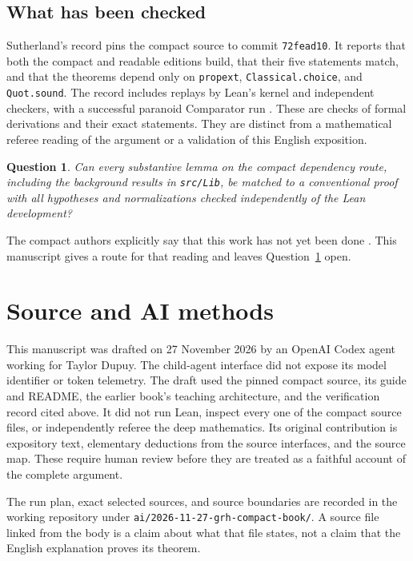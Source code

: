 \documentclass[11pt,oneside,openany]{amsbook}
\newtheorem{question}[theorem]{Question}
\theoremstyle{remark}
\numberwithin{equation}{section}
\begin{document}
\section{What has been checked}
Sutherland's record pins the compact source to commit
\texttt{72fead10}. It reports that both the compact and readable
editions build, that their five statements match, and that the
theorems depend only on \texttt{propext},
\texttt{Classical.choice}, and \texttt{Quot.sound}. The
record includes replays by Lean's kernel and independent
checkers, with a successful paranoid Comparator run
\cite[Summary]{Sutherland2026}. These are checks of formal
derivations and their exact statements. They are distinct from
a mathematical referee reading of the argument or a validation
of this English exposition.

\begin{question}
\label{q:human-proof}
Can every substantive lemma on the compact dependency route,
including the background results in \texttt{src/Lib}, be matched
to a conventional proof with all hypotheses and normalizations
checked independently of the Lean development?
\end{question}
The compact authors explicitly say that this work has not yet
been done \cite[Status]{Sernau2026}. This manuscript gives a
route for that reading and leaves Question~\ref{q:human-proof}
open.

\appendix
\chapter{Source and AI methods}
\label{ch:methods}
This manuscript was drafted on 27 November 2026 by an OpenAI
Codex agent working for Taylor Dupuy. The child-agent interface
did not expose its model identifier or token telemetry. The
draft used the pinned compact source, its guide and README,
the earlier book's teaching architecture, and the verification
record cited above. It did not run Lean, inspect every one of
the compact source files, or independently referee the deep
mathematics. Its original contribution is expository text,
elementary deductions from the source interfaces, and the
source map. These require human review before they are
treated as a faithful account of the complete argument.

The run plan, exact selected sources, and source boundaries are
recorded in the working repository under
\texttt{ai/2026-11-27-grh-compact-book/}. A source file linked
from the body is a claim about what that file states, not a
claim that the English explanation proves its theorem.



\end{document}
